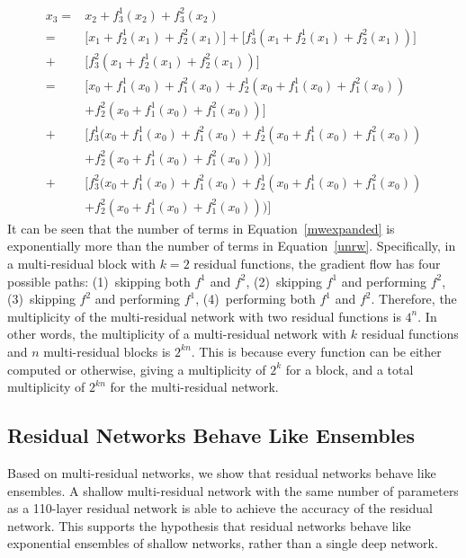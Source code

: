 \documentclass[journal]{IEEEtran}
\begin{document}
\begin{equation}\label{mwexpanded}
\begin{split}
x_3 =& x_2 + f_3^1(x_2) + f_3^2(x_2) \\
    =& \Big[ x_1 + f_2^1(x_1) + f_2^2(x_1)\Big] + \Big[f_3^1(x_1 + f_2^1(x_1) + f_2^2(x_1))\Big] \\
    +& \Big[f_3^2(x_1 + f_2^1(x_1) + f_2^2(x_1))\Big]\\
    =& \Big[ x_0 + f_1^1(x_0) + f_1^2(x_0)+ f_2^1(x_0+f_1^1(x_0)+f_1^2(x_0))\\
    & +f_2^2(x_0+f_1^1(x_0)+f_1^2(x_0))\Big] \\
    +& \Big[f_3^1(x_0 + f_1^1(x_0)+ f_1^2(x_0)+f_2^1(x_0 + f_1^1(x_0)+ f_1^2(x_0)) \\
    &+ f_2^2(x_0 + f_1^1(x_0)+ f_1^2(x_0))) \Big]  \\
    +& \Big[f_3^2(x_0 + f_1^1(x_0)+ f_1^2(x_0)+f_2^1(x_0 + f_1^1(x_0)+ f_1^2(x_0)) \\
    &+ f_2^2(x_0 + f_1^1(x_0)+ f_1^2(x_0))) \Big] 
\end{split}
\end{equation}
It can be seen that the number of terms in Equation~\ref{mwexpanded} is exponentially more than the number of terms in Equation~\ref{unrw}. Specifically, in a multi-residual block with $k=2$ residual functions, the gradient flow has four possible paths: (1)~skipping both $f^1$ and $f^2$, (2)~skipping $f^1$ and performing $f^2$, (3)~skipping $f^2$ and performing $f^1$, (4)~performing both $f^1$ and $f^2$. Therefore, the multiplicity of the multi-residual network with two residual functions is $4^n$. In other words, the multiplicity of a multi-residual network with $k$ residual functions and $n$ multi-residual blocks is $2^{kn}$. This is because every function can be either computed or otherwise, giving a multiplicity of $2^k$ for a block, and a total multiplicity of $2^{kn}$ for the multi-residual network.


\subsection{Residual Networks Behave Like Ensembles}


Based on multi-residual networks, we show that residual networks behave like ensembles. A shallow multi-residual network with the same number of parameters as a 110-layer residual network is able to achieve the accuracy of the residual network. This supports the hypothesis that residual networks behave like exponential ensembles of shallow networks, rather than a single deep network.
\end{document}
